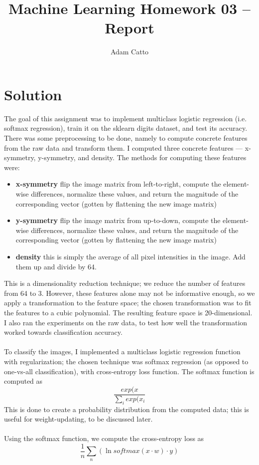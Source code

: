 \documentclass[11pt]{article}
\title{Machine Learning Homework 03 – Report}
\author{Adam Catto}
\date{ }
\begin{document}
\maketitle
\section{Solution}
The goal of this assignment was to implement multiclass logistic regression (i.e. softmax regression), train it on the sklearn digits dataset, and test its accuracy. There was some preprocessing to be done, namely to compute concrete features from the raw data and transform them. I computed three concrete features –– x-symmetry, y-symmetry, and density. The methods for computing these features were:
\begin{itemize}
	\item{\textbf{x-symmetry}} flip the image matrix from left-to-right, compute the element-wise differences, normalize these values, and return the magnitude of the corresponding vector (gotten by flattening the new image matrix)
	
	\item{\textbf{y-symmetry}} flip the image matrix from up-to-down, compute the element-wise differences, normalize these values, and return the magnitude of the corresponding vector (gotten by flattening the new image matrix)
	
	\item{\textbf{density}} this is simply the average of all pixel intensities in the image. Add them up and divide by 64.
\end{itemize}

This is a dimensionality reduction technique; we reduce the number of features from 64 to 3. However, these features alone may not be informative enough, so we apply a transformation to the feature space; the chosen transformation was to fit the features to a cubic polynomial. The resulting feature space is 20-dimensional. I also ran the experiments on the raw data, to test how well the transformation worked towards classification accuracy.  \\
 \\
To classify the images, I implemented a multiclass logistic regression function with regularization; the chosen technique was softmax regression (as opposed to one-vs-all classification), with cross-entropy loss function. The softmax function is computed as 
$$ \frac{exp(x}{\sum_i exp(x_i} $$
This is done to create a probability distribution from the computed data; this is useful for weight-updating, to be discussed later.\\
 \\
 Using the softmax function, we compute the cross-entropy loss as 
$$ \frac{1}{n}\sum_n (\ln softmax(x\cdot w) \cdot y) $$
\end{document}
